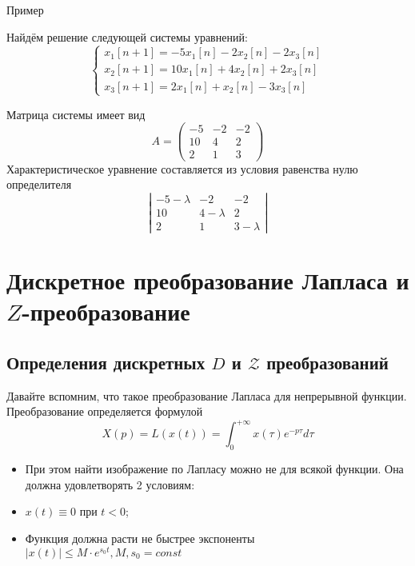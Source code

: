 \documentclass[12pt,twoside]{report}
\theoremstyle{MyNonumberplain}
\begin{document}
    \begin{example}{Пример}
        
    Найдём решение следующей системы уравнений:
    \begin{equation*}
        \begin{cases}
            x_1[n+1]= -5x_1[n]-2x_2[n]-2x_3[n]\\
            x_2[n+1]= 10x_1[n]+4x_2[n]+2x_3[n]\\
            x_3[n+1]= 2x_1[n]+x_2[n]-3x_3[n]
        \end{cases}
    \end{equation*}

    Матрица системы имеет вид
    \[
        A=\left(
            \begin{array}{ccc}
                -5 &-2 &-2\\
                10 &4 &2\\
                2 &1 &3
            \end{array}
        \right)
    \]
    Характеристическое уравнение составляется из условия равенства нулю определителя
    \[
        \left|
            \begin{array}{ccc}
                -5-\lambda&-2 &-2\\
                10 &4-\lambda &2\\
                2 &1 &3-\lambda
            \end{array}
        \right|
    \]
    \end{example}



    \chapter{Дискретное преобразование Лапласа и $Z$-преобразование}
    \section{Определения дискретных $D$ и $\mathcal{Z}$ преобразований}
        Давайте вспомним, что такое преобразование Лапласа для непрерывной функции. Преобразование определяется формулой
        \begin{equation}\label{Lapl}
            X(p)=L(x(t))=\int_0^{+\infty} x(\tau) e^{-p\tau} d\tau
        \end{equation}
        \begin{itemize}
            \item При этом найти изображение по Лапласу можно не для всякой функции. Она должна удовлетворять 2 условиям:
            \item $x(t) \equiv 0$ при $t < 0$;
            \item Функция должна расти не быстрее экспоненты $|x(t)| \le M\cdot e^{s_0 t}, M,s_0=const$
        \end{itemize}
\end{document}
